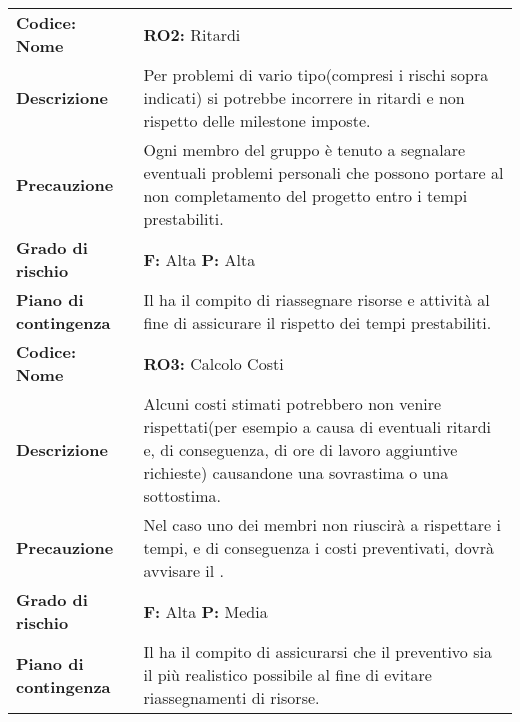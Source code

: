 {\begin{longtable}{C{3.5cm} | C{11cm}}
\textbf{Codice: Nome} & \textbf{RO2: }{Ritardi}\\
\textbf{Descrizione} & Per problemi di vario tipo(compresi i rischi sopra indicati) si potrebbe incorrere in ritardi e non rispetto delle milestone imposte.\\ 
\textbf{Precauzione} & Ogni membro del gruppo è tenuto a segnalare eventuali problemi personali che possono portare al non completamento del progetto entro i tempi prestabiliti.\\
\textbf{Grado di rischio} & \textbf{F: }Alta {\textbf{P: }}Alta\\
\textbf{Piano di contingenza} & Il \respProg{}ha il compito di riassegnare risorse e attività al fine di assicurare il rispetto dei tempi prestabiliti.\\
\hline

\textbf{Codice: Nome} & \textbf{RO3: }{Calcolo Costi}\\
\textbf{Descrizione} & Alcuni costi stimati potrebbero non venire rispettati(per esempio a causa di eventuali ritardi e, di conseguenza, di ore di lavoro aggiuntive richieste) causandone una sovrastima o una sottostima.\\
\textbf{Precauzione} & Nel caso uno dei membri non riuscirà a rispettare i tempi, e di conseguenza i costi preventivati, dovrà avvisare il \respProg{}.\\
\textbf{Grado di rischio} & \textbf{F: }Alta \textbf{P: }Media\\
\textbf{Piano di contingenza} & Il \respProg{} ha il compito di assicurarsi che il preventivo sia il più realistico possibile al fine di evitare riassegnamenti di risorse.\\
\hline
\end{longtable}
}
